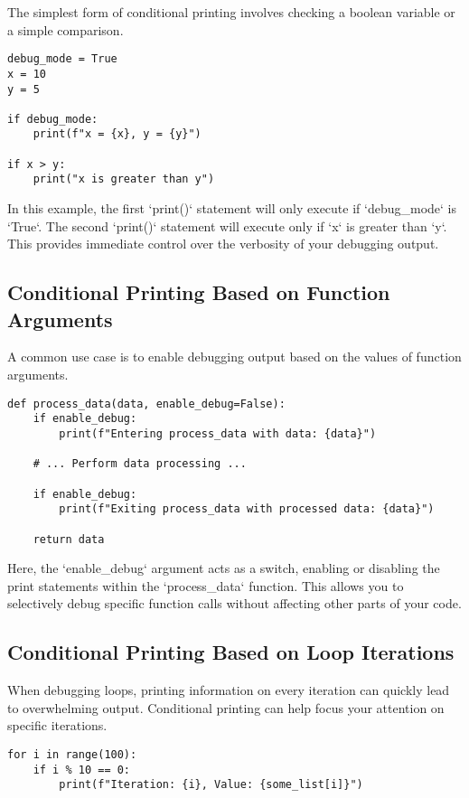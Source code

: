 \documentclass{article}
\begin{document}
{{{The simplest form of conditional printing involves checking a boolean variable or a simple comparison.

\begin{verbatim}
debug_mode = True
x = 10
y = 5

if debug_mode:
    print(f"x = {x}, y = {y}")

if x > y:
    print("x is greater than y")
\end{verbatim}

In this example, the first `print()` statement will only execute if `debug_mode` is `True`. The second `print()` statement will execute only if `x` is greater than `y`. This provides immediate control over the verbosity of your debugging output.

\subsection*{Conditional Printing Based on Function Arguments}

A common use case is to enable debugging output based on the values of function arguments.

\begin{verbatim}
def process_data(data, enable_debug=False):
    if enable_debug:
        print(f"Entering process_data with data: {data}")

    # ... Perform data processing ...

    if enable_debug:
        print(f"Exiting process_data with processed data: {data}")

    return data
\end{verbatim}

Here, the `enable_debug` argument acts as a switch, enabling or disabling the print statements within the `process_data` function. This allows you to selectively debug specific function calls without affecting other parts of your code.

\subsection*{Conditional Printing Based on Loop Iterations}

When debugging loops, printing information on every iteration can quickly lead to overwhelming output.  Conditional printing can help focus your attention on specific iterations.

\begin{verbatim}
for i in range(100):
    if i % 10 == 0:
        print(f"Iteration: {i}, Value: {some_list[i]}")
\end{verbatim}

}}}
\end{document}
